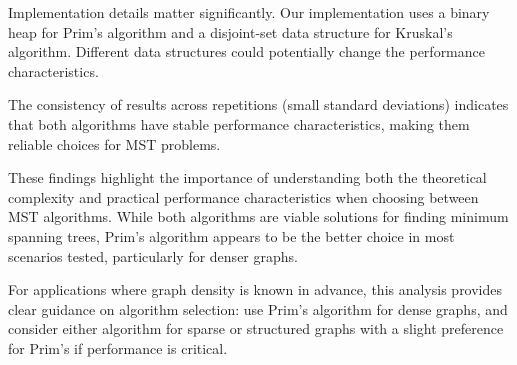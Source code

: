 \documentclass[a4paper,12pt]{article}
\begin{document}
Implementation details matter significantly. Our implementation uses a binary heap for Prim's algorithm and a disjoint-set data structure for Kruskal's algorithm. Different data structures could potentially change the performance characteristics.

The consistency of results across repetitions (small standard deviations) indicates that both algorithms have stable performance characteristics, making them reliable choices for MST problems.

These findings highlight the importance of understanding both the theoretical complexity and practical performance characteristics when choosing between MST algorithms. While both algorithms are viable solutions for finding minimum spanning trees, Prim's algorithm appears to be the better choice in most scenarios tested, particularly for denser graphs.

For applications where graph density is known in advance, this analysis provides clear guidance on algorithm selection: use Prim's algorithm for dense graphs, and consider either algorithm for sparse or structured graphs with a slight preference for Prim's if performance is critical.
\end{document}
